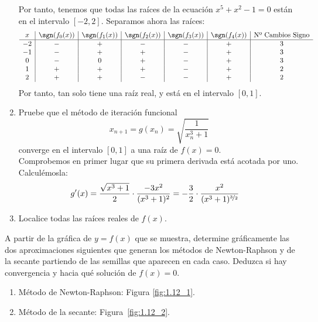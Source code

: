 \begin{ejercicio}
\begin{enumerate}
        Por tanto, tenemos que todas las raíces de la ecuación $x^5+x^2-1=0$ están en el intervalo $[-2,2]$. Separamos ahora las raíces:
        \begin{equation*}
            \begin{array}{c|c|c|c|c|c|c}
                x & \sgn(f_0(x)) & \sgn(f_1(x)) & \sgn(f_2(x)) & \sgn(f_3(x)) & \sgn(f_4(x)) & \text{Nº Cambios Signo}\\ \hline
                -2& - & + & - & - & + & 3\\
                -1& - & + & + & - & + & 3\\
                0 & - & 0 & + & - & + & 3\\
                1 & + & + & + & - & + & 2\\
                2 & + & + & - & - & + & 2
            \end{array}
        \end{equation*}
        Por tanto, tan solo tiene una raíz real, y está en el intervalo $[0,1]$.
        \item Pruebe que el método de iteración funcional
        $$x_{n+1} = g(x_n) = \sqrt{\dfrac{1}{x_n^3+1}}$$
        converge en el intervalo $[0, 1]$ a una raíz de $f(x) = 0$.\\
        
        Comprobemos en primer lugar que su primera derivada está acotada por uno. Calculémosla:
        \begin{align*}
            g'(x)&= \dfrac{\sqrt{x^3+1}}{2}\cdot \dfrac{-3x^2}{(x^3+1)^2}
            = -\dfrac{3}{2}\cdot \dfrac{x^2}{(x^3+1)^{\nicefrac{3}{2}}}
        \end{align*}
        
        \item Localice todas las raíces reales de $f(x)$.
    \end{enumerate}
\end{ejercicio}

\begin{ejercicio}\label{ej:1.1.12}
    A partir de la gráfica de $y = f(x)$ que se muestra, determine gráficamente las dos aproximaciones siguientes que generan los métodos de Newton-Raphson y de la secante partiendo de las semillas que aparecen en cada caso. Deduzca si hay convergencia y hacia qué solución de $f(x) = 0$.
    \begin{enumerate}
        \item Método de Newton-Raphson: Figura \ref{fig:1.12_1}.
        \item Método de la secante: Figura~\ref{fig:1.12_2}.
    \end{enumerate}
\end{ejercicio}


